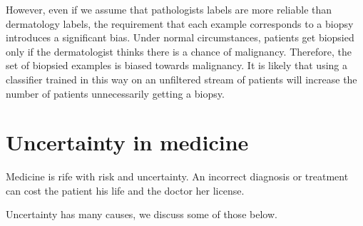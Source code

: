 \documentclass[11pt]{article}
\begin{document}
However, even if we assume that pathologists labels are more reliable
than dermatology labels, the requirement that each example corresponds
to a biopsy introduces a significant bias. Under normal circumstances, patients get
biopsied only if the dermatologist thinks there is a chance of
{\color{blue}malignancy. Therefore}, the set of biopsied examples is biased towards
{\color{blue}malignancy}. It is likely that using a classifier trained in this way
on an unfiltered stream of patients will increase the number of
patients unnecessarily getting a biopsy.

\section*{Uncertainty in medicine}

Medicine is rife with risk and uncertainty. An incorrect diagnosis or
treatment can cost the patient his life and the doctor her license.

Uncertainty has many causes, we discuss some of those below.

\end{document}
